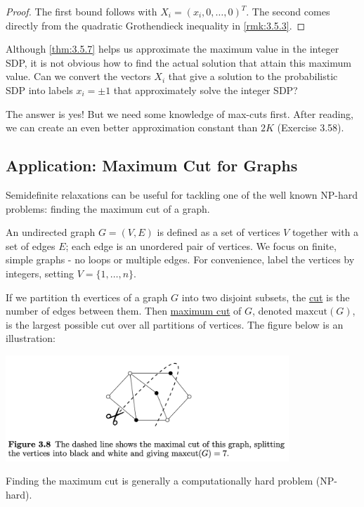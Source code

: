 \begin{proof}
The first bound follows with $X_i = (x_i, 0, \dots, 0)^T$. The second comes directly from the quadratic 
Grothendieck inequality in \cref{rmk:3.5.3}.
\end{proof}

Although \cref{thm:3.5.7} helps us approximate the maximum value in the integer SDP, it is not obvious how to 
find the actual solution that attain this maximum value. Can we convert the vectors $X_i$ that give a solution 
to the probabilistic SDP into labels $x_i = \pm 1$ that approximately solve the integer SDP?

The answer is yes! But we need some knowledge of max-cuts first. After reading, we can create an even better 
approximation constant than $2K$ (Exercise 3.58).



\subsection{Application: Maximum Cut for Graphs}
Semidefinite relaxations can be useful for tackling one of the well known NP-hard problems: finding the maximum 
cut of a graph.

An undirected graph $G = (V, E)$ is defined as a set of vertices $V$ together with a set of edges $E$; each 
edge is an unordered pair of vertices. We focus on finite, simple graphs - no loops or multiple edges. For 
convenience, label the vertices by integers, setting $V = \{1, \dots, n\}$.

\begin{definition}[]
\label{def:3.6.1}
If we partition th evertices of a graph $G$ into two disjoint subsets, the \underline{cut} is the number of 
edges between them. Then \underline{maximum cut} of $G$, denoted $\mathrm{maxcut}(G)$, is the largest possible 
cut over all partitions of vertices. The figure below is an illustration:
\begin{center}
	\includegraphics[width=0.8\textwidth]{Chapter 3/fig3-8.png}
\end{center}
\end{definition}
Finding the maximum cut is generally a computationally hard problem (NP-hard).


